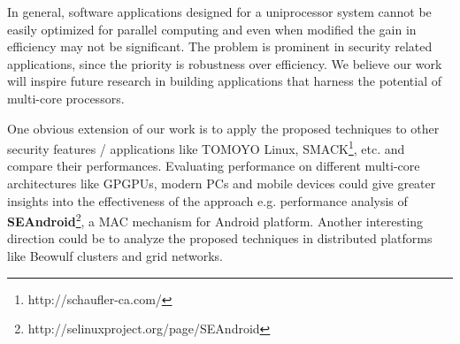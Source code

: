\documentclass[conference]{IEEEtran}
\begin{document}
In general, software applications designed for a uniprocessor system cannot be easily optimized for parallel computing and even when modified the gain in efficiency may not be significant. The problem is prominent in security related applications, since the priority is robustness over efficiency. We believe our work will inspire future research in building applications that harness the potential of multi-core processors. 

One obvious extension of our work is to apply the proposed techniques
to other security features / applications like TOMOYO Linux, SMACK\footnote{http://schaufler-ca.com/}, etc. and compare their performances. Evaluating performance on different
multi-core architectures like GPGPUs, modern PCs and mobile devices
could give greater insights into the effectiveness of the approach
e.g. performance analysis of
\textbf{SEAndroid}\footnote{http://selinuxproject.org/page/SEAndroid},
a MAC mechanism for Android platform.  Another interesting direction could be to analyze
 the proposed techniques in distributed platforms like Beowulf
 clusters and grid networks.


\end{document}
